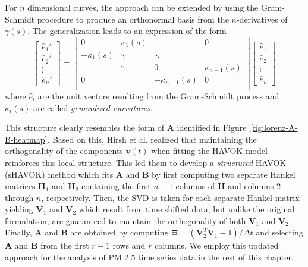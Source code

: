 For $n$ dimensional curves, the approach can be extended by using the
Gram-Schmidt procedure to produce an orthonormal basis from the $n$-derivatives
of $\gamma(s)$. The generalization leads to an expression of the form
\begin{equation}
    \begin{bmatrix} \hat{e}_1' \\ \hat{e}_2' \\ \vdots \\ \hat{e}_n' \end{bmatrix} = \begin{bmatrix}
    0 & \kappa_1(s) &  & 0 \\
    -\kappa_1(s) & \ddots & \ddots & \\
     & \ddots & 0 & \kappa_{n-1}(s) \\
     0 &  & -\kappa_{n-1}(s) & 0 \\
    \end{bmatrix} \begin{bmatrix} \hat{e}_1 \\ \hat{e}_2 \\ \vdots \\ \hat{e}_n \end{bmatrix}
\end{equation}
where $\hat{e}_i$ are the unit vectors resulting from the Gram-Schmidt process
and $\kappa_i(s)$ are called \textit{generalized curvatures}.

This structure clearly resembles the form of $\mathbf{A}$ identified in
Figure~\ref{fig:lorenz-A-B-heatmap}. Based on this, Hirsh et al. realized that
maintaining the orthogonality of the components $\mathbf{v}(t)$ when fitting the
HAVOK model reinforces this local structure. This led them to develop a
\textit{structured}-HAVOK (sHAVOK) method which fits $\mathbf{A}$ and
$\mathbf{B}$ by first computing two separate Hankel matrices $\mathbf{H}_1$ and
$\mathbf{H}_2$ containing the first $n-1$ columns of $\mathbf{H}$ and
columns 2 through $n$, respectively. Then, the SVD is taken for each separate
Hankel matrix yielding $\mathbf{V}_1$ and $\mathbf{V}_2$ which result from time
shifted data, but unlike the original formulation, are guaranteed to maintain
the orthogonality of both $\mathbf{V}_1$ and $\mathbf{V}_2$. Finally,
$\mathbf{A}$ and $\mathbf{B}$ are obtained by computing $\mathbf{\Xi} =
(\mathbf{V}_2^T\mathbf{V}_1 - \mathbf{I})/\Delta t$ and selecting $\mathbf{A}$
and $\mathbf{B}$ from the first $r-1$ rows and $r$ columns. We employ this
updated approach for the analysis of PM 2.5 time series data in the rest of this
chapter.

